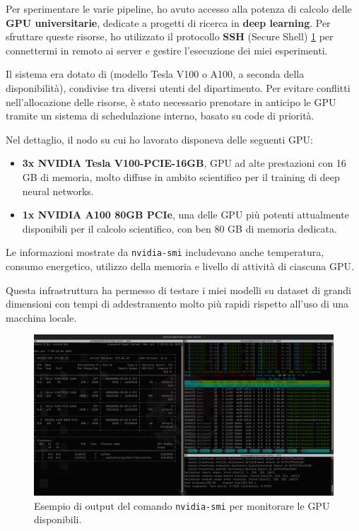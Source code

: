 Per sperimentare le varie pipeline, ho avuto accesso alla potenza di calcolo delle \textbf{GPU universitarie}, dedicate a progetti di ricerca in \textbf{deep learning}. Per sfruttare queste risorse, ho utilizzato il protocollo \textbf{SSH} (Secure Shell) \ref{fig:gpu_info} per connettermi in remoto ai server e gestire l’esecuzione dei miei esperimenti.

Il sistema era dotato di  (modello Tesla V100 o A100, a seconda della disponibilità), condivise tra diversi utenti del dipartimento. Per evitare conflitti nell’allocazione delle risorse, è stato necessario prenotare in anticipo le GPU tramite un sistema di schedulazione interno, basato su code di priorità.

Nel dettaglio, il nodo su cui ho lavorato disponeva delle seguenti GPU:
\begin{itemize}
\item \textbf{3x NVIDIA Tesla V100-PCIE-16GB}, GPU ad alte prestazioni con 16 GB di memoria, molto diffuse in ambito scientifico per il training di deep neural networks.
\item \textbf{1x NVIDIA A100 80GB PCIe}, una delle GPU più potenti attualmente disponibili per il calcolo scientifico, con ben 80 GB di memoria dedicata. 
\end{itemize}

Le informazioni mostrate da \texttt{nvidia-smi} includevano anche temperatura, consumo energetico, utilizzo della memoria e livello di attività di ciascuna GPU. 

Questa infrastruttura ha permesso di testare i miei modelli su dataset di grandi dimensioni con tempi di addestramento molto più rapidi rispetto all’uso di una macchina locale.

\begin{figure}[H] 
  	\centering 
 	\includegraphics[width=\textwidth]{images/2025-07-07-09-52-55.png} 
	 \caption{Esempio di output del comando \texttt{nvidia-smi} per monitorare le GPU disponibili.}
	 \label{fig:gpu_info}
 \end{figure} 